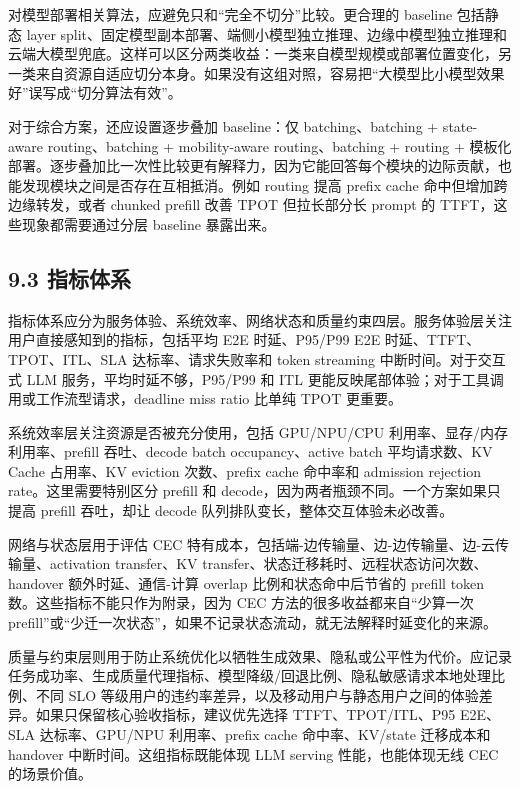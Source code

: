 对模型部署相关算法，应避免只和“完全不切分”比较。更合理的 baseline 包括静态 layer split、固定模型副本部署、端侧小模型独立推理、边缘中模型独立推理和云端大模型兜底。这样可以区分两类收益：一类来自模型规模或部署位置变化，另一类来自资源自适应切分本身。如果没有这组对照，容易把“大模型比小模型效果好”误写成“切分算法有效”。

对于综合方案，还应设置逐步叠加 baseline：仅 batching、batching + state-aware routing、batching + mobility-aware routing、batching + routing + 模板化部署。逐步叠加比一次性比较更有解释力，因为它能回答每个模块的边际贡献，也能发现模块之间是否存在互相抵消。例如 routing 提高 prefix cache 命中但增加跨边缘转发，或者 chunked prefill 改善 TPOT 但拉长部分长 prompt 的 TTFT，这些现象都需要通过分层 baseline 暴露出来。


\subsection*{9.3 指标体系}

指标体系应分为服务体验、系统效率、网络状态和质量约束四层。服务体验层关注用户直接感知到的指标，包括平均 E2E 时延、P95/P99 E2E 时延、TTFT、TPOT、ITL、SLA 达标率、请求失败率和 token streaming 中断时间。对于交互式 LLM 服务，平均时延不够，P95/P99 和 ITL 更能反映尾部体验；对于工具调用或工作流型请求，deadline miss ratio 比单纯 TPOT 更重要。

系统效率层关注资源是否被充分使用，包括 GPU/NPU/CPU 利用率、显存/内存利用率、prefill 吞吐、decode batch occupancy、active batch 平均请求数、KV Cache 占用率、KV eviction 次数、prefix cache 命中率和 admission rejection rate。这里需要特别区分 prefill 和 decode，因为两者瓶颈不同。一个方案如果只提高 prefill 吞吐，却让 decode 队列排队变长，整体交互体验未必改善。

网络与状态层用于评估 CEC 特有成本，包括端-边传输量、边-边传输量、边-云传输量、activation transfer、KV transfer、状态迁移耗时、远程状态访问次数、handover 额外时延、通信-计算 overlap 比例和状态命中后节省的 prefill token 数。这些指标不能只作为附录，因为 CEC 方法的很多收益都来自“少算一次 prefill”或“少迁一次状态”，如果不记录状态流动，就无法解释时延变化的来源。

质量与约束层则用于防止系统优化以牺牲生成效果、隐私或公平性为代价。应记录任务成功率、生成质量代理指标、模型降级/回退比例、隐私敏感请求本地处理比例、不同 SLO 等级用户的违约率差异，以及移动用户与静态用户之间的体验差异。如果只保留核心验收指标，建议优先选择 TTFT、TPOT/ITL、P95 E2E、SLA 达标率、GPU/NPU 利用率、prefix cache 命中率、KV/state 迁移成本和 handover 中断时间。这组指标既能体现 LLM serving 性能，也能体现无线 CEC 的场景价值。


